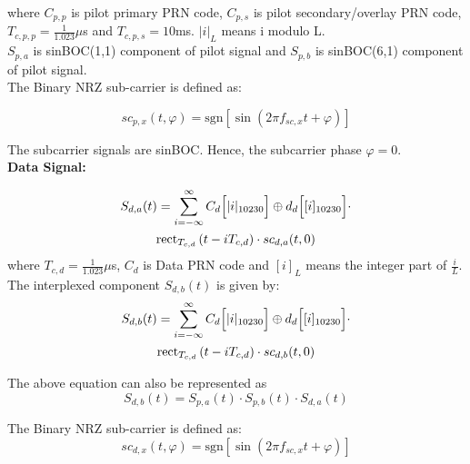 \documentclass[conference]{IEEEtran}
\begin{document}
\noindent where $C_{p,p}$ is pilot primary PRN code, $C_{p,s}$ is pilot secondary/overlay PRN code, 
$T_{c,p,p} = \frac{1}{1.023}\mu$s and $T_{c,p,s}= 10$ms. $|i|_{L}$ means i modulo L.\\

\noindent $S_{p,a}$ is sinBOC(1,1) component of pilot signal and $S_{p,b}$ is sinBOC(6,1) component 
of pilot signal.
\\

\noindent The Binary NRZ sub-carrier is defined as:

\begin{equation}
sc_{p,x}(t, \varphi) = \text{sgn}[\sin(2\pi f_{sc,x}t + \varphi)]
\label{eq:sub_carrier}
\end{equation}

\noindent The subcarrier signals are sinBOC. Hence, the subcarrier phase $\varphi=0$. \\

\noindent\textbf{Data Signal:}

\begin{multline}
S_{d,a}(t) = \sum_{i=-\infty}^{\infty} C_d\Bigl[|i|_{10230} \Bigr] \oplus d_d\Bigl[[i]_{10230}\Bigr] \cdot \\
\text{rect} _{T_{c,d}} \left({t - iT_{c,d}}\right) \cdot sc_{d,a}(t, 0)
\label{eq:signal_da}
\end{multline}
\noindent where $T_{c,d} = \frac{1}{1.023}\mu$s, $C_d$ is Data PRN code and $[i]_L$ means the integer part of $\frac{i}{L}$.\\

\noindent The interplexed component $S_{d,b}(t)$ is given by:
\begin{multline}
S_{d,b}(t) = \sum_{i=-\infty}^{\infty} C_d\Bigl[|i|_{10230}\Bigr] \oplus d_d\Bigl[[i]_{10230}\Bigr] \cdot \\
\text{rect}_{T_{c,d}} \left( t - iT_{c,d} \right) \cdot sc_{d,b}(t, 0)
\label{eq:interplexed_component}
\end{multline}

\noindent The above equation can also be represented as
\begin{equation}
    S_{d,b}(t) = S_{p,a}(t) \cdot S_{p,b}(t) \cdot S_{d,a}(t)
    \label{eq:interplexed_component1}
\end{equation}

\noindent The Binary NRZ sub-carrier is defined as:
\begin{equation}
sc_{d,x}(t, \varphi) = \text{sgn}[\sin(2\pi f_{sc,x}t + \varphi)]
\label{eq:subcarrier_dc}
\end{equation}
\end{document}
